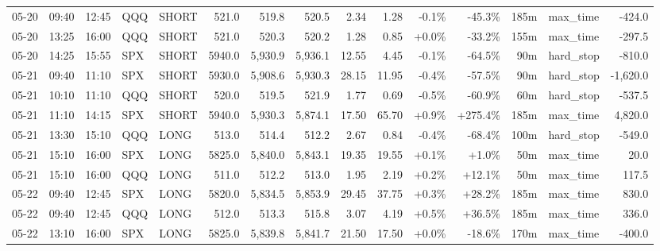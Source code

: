 \documentclass[11pt,a4paper,twoside]{article}
\begin{document}
\begin{landscape}
\begin{center}
\begin{longtable}{>{\color{txtmain}}l l l l l r r r r r r r r >{\color{txtmain}}l r}
05-20 & 09:40 & 12:45 & QQQ & SHORT & 521.0 & 519.8 & 520.5 & 2.34 & 1.28 & \textcolor{lossred}{-0.1\%} & \textcolor{lossred}{-45.3\%} & 185m & max\_time & \textcolor{lossred}{-424.0} \\
05-20 & 13:25 & 16:00 & QQQ & SHORT & 521.0 & 520.3 & 520.2 & 1.28 & 0.85 & \textcolor{wingreen}{+0.0\%} & \textcolor{lossred}{-33.2\%} & 155m & max\_time & \textcolor{lossred}{-297.5} \\
05-20 & 14:25 & 15:55 & SPX & SHORT & 5940.0 & 5,930.9 & 5,936.1 & 12.55 & 4.45 & \textcolor{lossred}{-0.1\%} & \textcolor{lossred}{-64.5\%} & 90m & hard\_stop & \textcolor{lossred}{-810.0} \\
05-21 & 09:40 & 11:10 & SPX & SHORT & 5930.0 & 5,908.6 & 5,930.3 & 28.15 & 11.95 & \textcolor{lossred}{-0.4\%} & \textcolor{lossred}{-57.5\%} & 90m & hard\_stop & \textcolor{lossred}{-1,620.0} \\
05-21 & 10:10 & 11:10 & QQQ & SHORT & 520.0 & 519.5 & 521.9 & 1.77 & 0.69 & \textcolor{lossred}{-0.5\%} & \textcolor{lossred}{-60.9\%} & 60m & hard\_stop & \textcolor{lossred}{-537.5} \\
05-21 & 11:10 & 14:15 & SPX & SHORT & 5940.0 & 5,930.3 & 5,874.1 & 17.50 & 65.70 & \textcolor{wingreen}{+0.9\%} & \textcolor{wingreen}{+275.4\%} & 185m & max\_time & \textcolor{wingreen}{4,820.0} \\
05-21 & 13:30 & 15:10 & QQQ & LONG & 513.0 & 514.4 & 512.2 & 2.67 & 0.84 & \textcolor{lossred}{-0.4\%} & \textcolor{lossred}{-68.4\%} & 100m & hard\_stop & \textcolor{lossred}{-549.0} \\
05-21 & 15:10 & 16:00 & SPX & LONG & 5825.0 & 5,840.0 & 5,843.1 & 19.35 & 19.55 & \textcolor{wingreen}{+0.1\%} & \textcolor{wingreen}{+1.0\%} & 50m & max\_time & \textcolor{wingreen}{20.0} \\
05-21 & 15:10 & 16:00 & QQQ & LONG & 511.0 & 512.2 & 513.0 & 1.95 & 2.19 & \textcolor{wingreen}{+0.2\%} & \textcolor{wingreen}{+12.1\%} & 50m & max\_time & \textcolor{wingreen}{117.5} \\
05-22 & 09:40 & 12:45 & SPX & LONG & 5820.0 & 5,834.5 & 5,853.9 & 29.45 & 37.75 & \textcolor{wingreen}{+0.3\%} & \textcolor{wingreen}{+28.2\%} & 185m & max\_time & \textcolor{wingreen}{830.0} \\
05-22 & 09:40 & 12:45 & QQQ & LONG & 512.0 & 513.3 & 515.8 & 3.07 & 4.19 & \textcolor{wingreen}{+0.5\%} & \textcolor{wingreen}{+36.5\%} & 185m & max\_time & \textcolor{wingreen}{336.0} \\
05-22 & 13:10 & 16:00 & SPX & LONG & 5825.0 & 5,839.8 & 5,841.7 & 21.50 & 17.50 & \textcolor{wingreen}{+0.0\%} & \textcolor{lossred}{-18.6\%} & 170m & max\_time & \textcolor{lossred}{-400.0} \\

\end{longtable}
\end{center}
\end{landscape}
\end{document}
